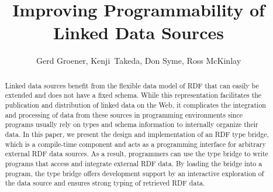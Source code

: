 \documentclass{llncs} %
\begin{document}
\title{Improving Programmability of Linked Data Sources}
 





\author{Gerd Groener, Kenji~Takeda, Don Syme, Ross McKinlay}



\maketitle

\begin{abstract}
Linked data sources benefit from the flexible data model of RDF that
can easily be extended and does not have a fixed schema.
While this representation facilitates the publication and distribution of
linked data on the Web, it complicates the integration and processing of
data from these sources in programming environments since programs usually
rely on types and schema information to internally organize their data.
In this paper, we present the design and implementation
of an RDF type bridge, which is a compile-time component and acts
as a programming interface for arbitrary external RDF data sources.
As a result, programmers can use the type bridge to write programs
that access and integrate external RDF data. By loading the bridge into
a program, the type bridge offers development support by an interactive exploration
of the data source and ensures strong typing of retrieved RDF data.
\end{abstract}



%
%
%
%
\end{document}
